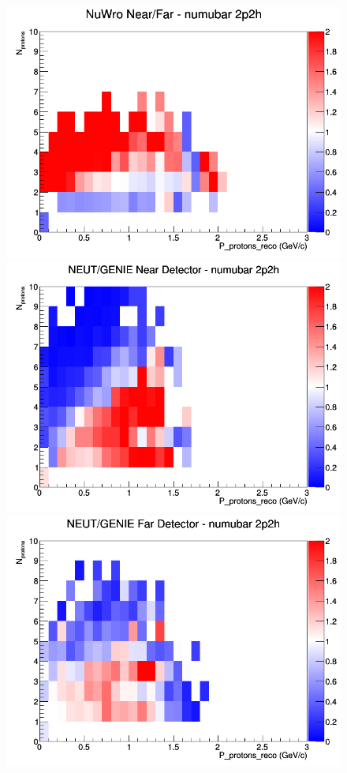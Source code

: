 \begin{figure}[h]
\endminipage
{}
\includegraphics[width=\linewidth]{eff_N_P/GAr/protons/ratios/2p2h_NuWro_numubar_NF_N_P.png}
\endminipage
\newline
{}
\includegraphics[width=\linewidth]{eff_N_P/GAr/protons/ratios/2p2h_NEUT_GENIE_numubar_near_N_P.png}
\endminipage
{}
\includegraphics[width=\linewidth]{eff_N_P/GAr/protons/ratios/2p2h_NEUT_GENIE_numubar_far_N_P.png}

\end{figure}
